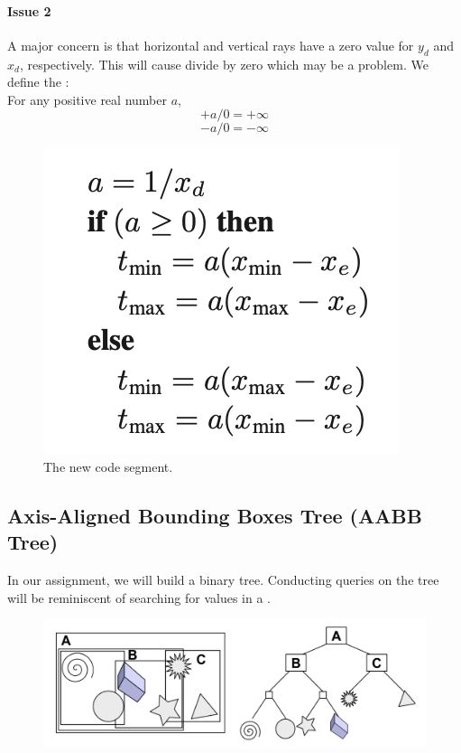 \documentclass[11pt]{article}
\numberwithin{equation}{section}
\begin{document}
\paragraph{Issue 2}
A major concern is that horizontal and vertical rays have a zero value for $y_d$ and $x_d$, respectively. This will cause divide by zero which may be a problem. We define the : \\
For any positive real number $a$,
$$+a / 0 = +\infty$$
$$-a / 0 = -\infty$$
	\begin{figure}[H]
	\centering
	\includegraphics[scale=0.7]{p9}
	\caption{The new code segment.}
	\end{figure}

\subsection{Axis-Aligned Bounding Boxes Tree (AABB Tree)}
In our assignment, we will build a binary tree. Conducting queries on the tree will be reminiscent of searching for values in a .

	\begin{figure}[H]
	\centering
	\includegraphics[scale=0.7]{p36}
	\end{figure}
\end{document}
